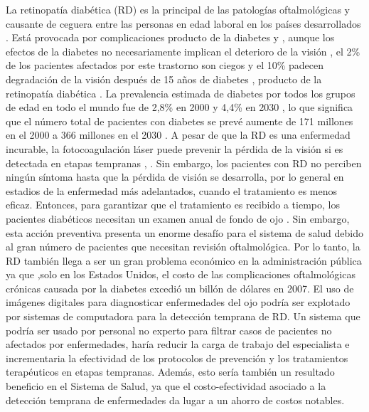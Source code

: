 La retinopat\'ia diab\'etica (RD) es la principal de las patolog\'ias oftalmol\'ogicas y causante de ceguera entre las personas en edad laboral en los pa\'ises desarrollados \cite{taylor2001world}. Est\'a provocada por complicaciones producto de la diabetes y , aunque los efectos de la diabetes no necesariamente implican el deterioro de la visión , el 2\% de los pacientes afectados por este trastorno son ciegos y el 10\% padecen  degradaci\'on de la visi\'on despu\'es de 15 años de diabetes \cite{klein1995retinal}, \cite{massin2000retinopathie} producto de la retinopatía diabética . La prevalencia estimada de diabetes por todos los grupos de edad en todo el mundo fue de 2,8\% en 2000 y 4,4\% en 2030 , lo que significa que el n\'umero total de pacientes con diabetes se prev\'e aumente de 171 millones en el  2000 a 366 millones en el 2030 \cite{wild2004global}.
	A pesar de que la RD es una enfermedad incurable, la fotocoagulaci\'on l\'aser puede prevenir la p\'erdida de la visi\'on si es detectada en etapas tempranas \cite{taylor2001world}, \cite{lee2001costs}. Sin embargo, los pacientes con RD no perciben ning\'un s\'intoma hasta que la p\'erdida de visi\'on se desarrolla, por lo general en estadios de la enfermedad más adelantados, cuando el tratamiento es menos eficaz. Entonces, para garantizar que el tratamiento es recibido a tiempo, los pacientes diab\'eticos necesitan un examen anual de fondo de ojo \cite{fong2004retinopathy}. Sin embargo, esta acci\'on preventiva presenta un enorme desaf\'io para el sistema de salud debido  al gran n\'umero de pacientes que necesitan revisi\'on oftalmológica. Por lo tanto, la RD tambi\'en llega a ser un gran problema econ\'omico en la  administraci\'on p\'ublica ya que ,solo en los Estados Unidos, el costo de las complicaciones oftalmol\'ogicas cr\'onicas causada por la diabetes excedi\'o un bill\'on de d\'olares en 2007. \cite{american2008economic}
El uso de im\'agenes digitales para diagnosticar enfermedades del ojo podr\'ia ser explotado por sistemas de computadora para la detecci\'on temprana de RD. Un sistema que podr\'ia ser  usado por personal no experto para filtrar casos de pacientes no afectados por enfermedades, har\'ia reducir la carga de trabajo del especialista e incrementaria la efectividad de los protocolos de prevenci\'on y los tratamientos terap\'euticos en etapas tempranas. Adem\'as, esto ser\'ia tambi\'en un resultado beneficio en el Sistema de Salud, ya que el costo-efectividad asociado a la detecci\'on temprana de enfermedades da lugar a un ahorro de costos notables. \cite{AmericanAcademyofOphthalmologyRetinaPanel}
